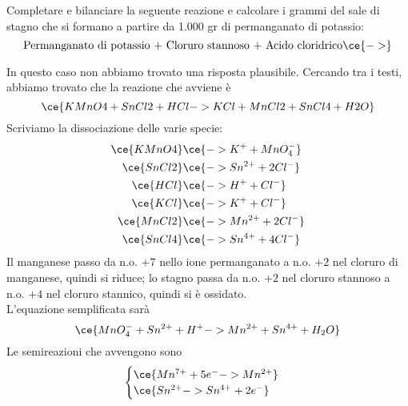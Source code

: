 \newpage

\begin{esercizio}
    Completare e bilanciare la seguente reazione e calcolare i grammi del sale di stagno che si formano a partire da 1.000 gr di permanganato di potassio:
    \begin{equation*}
        \text{Permanganato di potassio + Cloruro stannoso + Acido cloridrico}
        \ce{->}
    \end{equation*}
\end{esercizio}
\begin{soluzione}
    In questo caso non abbiamo trovato una risposta plausibile. Cercando tra i testi, abbiamo trovato che la reazione che avviene è
    \begin{equation*}
        \ce{KMnO4 + SnCl2 + HCl -> KCl + MnCl2 + SnCl4 + H2O}
    \end{equation*}
    Scriviamo la dissociazione delle varie specie:
    \begin{equation*}
        \begin{split}
            \ce{KMnO4} & \ce{-> K^+ + MnO_4^-}
            \\
            \ce{SnCl2} & \ce{-> Sn^{2+} + 2Cl^-}
            \\
            \ce{HCl} & \ce{-> H^+ + Cl^-}
            \\
            \ce{KCl} & \ce{-> K^+ + Cl^-}
            \\
            \ce{MnCl2} & \ce{-> Mn^{2+} + 2Cl^-}
            \\
            \ce{SnCl4} & \ce{-> Sn^{4+} + 4Cl^-}
        \end{split}
    \end{equation*}
    Il manganese passo da n.o. $+7$ nello ione permanganato a n.o. $+2$ nel cloruro di manganese, quindi si riduce; lo stagno passa da n.o. $+2$ nel cloruro stannoso a n.o. $+4$ nel cloruro stannico, quindi si è ossidato.\\
    L'equazione semplificata sarà
    \begin{equation*}
        \ce{MnO_4^- + Sn^{2+} + H^+ -> Mn^{2+} + Sn^{4+} + H_2O}
    \end{equation*}
    Le semireazioni che avvengono sono
    \begin{equation*}
        \begin{cases}
            \ce{Mn^{7+} + 5e^- -> Mn^{2+}}\\
            \ce{Sn^{2+} -> Sn^{4+} + 2e^-}
        \end{cases}
    \end{equation*}

\end{soluzione}

